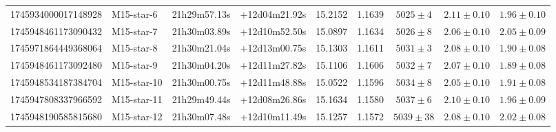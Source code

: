\begin{table}
\begin{tabular}{llccccccc}
1745934000017148928 & M15-star-6  & 21h29m57.13s & +12d04m21.92s & 15.2152 & 1.1639 & $5025 \pm 4$ & $2.11 \pm 0.10$ & $1.96 \pm 0.10$ \\ 
1745948461173090432 & M15-star-7  & 21h30m03.89s & +12d10m52.50s & 15.0897 & 1.1634 & $5026 \pm 8$ & $2.06 \pm 0.10$ & $2.05 \pm 0.09$ \\ 
1745971864449368064 & M15-star-8  & 21h30m21.04s & +12d13m00.75s & 15.1303 & 1.1611 & $5031 \pm 3$ & $2.08 \pm 0.10$ & $1.90 \pm 0.08$ \\ 
1745948461173092480 & M15-star-9  & 21h30m04.20s & +12d11m27.82s & 15.1106 & 1.1606 & $5032 \pm 7$ & $2.07 \pm 0.10$ & $1.89 \pm 0.08$ \\ 
1745948534187384704 & M15-star-10 & 21h30m00.75s & +12d11m48.88s & 15.0522 & 1.1596 & $5034 \pm 8$ & $2.05 \pm 0.10$ & $1.91 \pm 0.08$ \\ 
1745947808337966592 & M15-star-11 & 21h29m49.44s & +12d08m26.86s & 15.1634 & 1.1580 & $5037 \pm 6$ & $2.10 \pm 0.10$ & $1.96 \pm 0.09$ \\ 
1745948190585815680 & M15-star-12 & 21h30m07.48s & +12d10m11.49s & 15.1257 & 1.1572 & $5039 \pm 38$ & $2.08 \pm 0.10$ & $2.02 \pm 0.08$ \\ 
\bottomrule
\end{tabular}
\end{table}